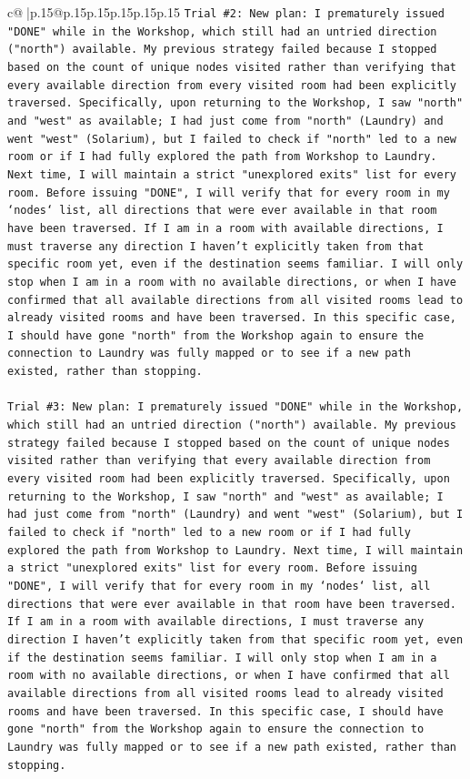 \documentclass{article}
\begin{document}
{\begin{supertabular}{c@{$\;$}|p{.15\linewidth}@{}p{.15\linewidth}p{.15\linewidth}p{.15\linewidth}p{.15\linewidth}p{.15\linewidth}}
{{{\texttt{Trial \#2: New plan: I prematurely issued "DONE" while in the Workshop, which still had an untried direction ("north") available. My previous strategy failed because I stopped based on the count of unique nodes visited rather than verifying that every available direction from every visited room had been explicitly traversed. Specifically, upon returning to the Workshop, I saw "north" and "west" as available; I had just come from "north" (Laundry) and went "west" (Solarium), but I failed to check if "north" led to a new room or if I had fully explored the path from Workshop to Laundry. Next time, I will maintain a strict "unexplored exits" list for every room. Before issuing "DONE", I will verify that for every room in my `nodes` list, all directions that were ever available in that room have been traversed. If I am in a room with available directions, I must traverse any direction I haven't explicitly taken from that specific room yet, even if the destination seems familiar. I will only stop when I am in a room with no available directions, or when I have confirmed that all available directions from all visited rooms lead to already visited rooms and have been traversed. In this specific case, I should have gone "north" from the Workshop again to ensure the connection to Laundry was fully mapped or to see if a new path existed, rather than stopping.} \\
\\ 
\texttt{Trial \#3: New plan: I prematurely issued "DONE" while in the Workshop, which still had an untried direction ("north") available. My previous strategy failed because I stopped based on the count of unique nodes visited rather than verifying that every available direction from every visited room had been explicitly traversed. Specifically, upon returning to the Workshop, I saw "north" and "west" as available; I had just come from "north" (Laundry) and went "west" (Solarium), but I failed to check if "north" led to a new room or if I had fully explored the path from Workshop to Laundry. Next time, I will maintain a strict "unexplored exits" list for every room. Before issuing "DONE", I will verify that for every room in my `nodes` list, all directions that were ever available in that room have been traversed. If I am in a room with available directions, I must traverse any direction I haven't explicitly taken from that specific room yet, even if the destination seems familiar. I will only stop when I am in a room with no available directions, or when I have confirmed that all available directions from all visited rooms lead to already visited rooms and have been traversed. In this specific case, I should have gone "north" from the Workshop again to ensure the connection to Laundry was fully mapped or to see if a new path existed, rather than stopping.} \\
}}}
\end{supertabular}}
\end{document}
